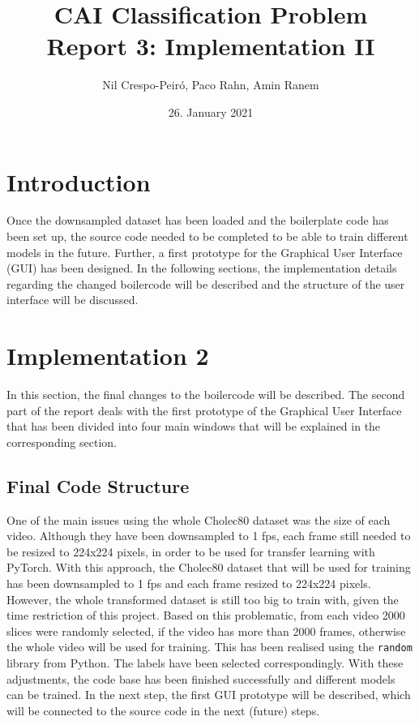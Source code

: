 \documentclass{article}
\title{CAI Classification Problem\\Report 3: Implementation II}
\author{Nil Crespo-Peiró, Paco Rahn, Amin Ranem}
\date{26. January 2021}
\begin{document}
\maketitle

\section{Introduction}
Once the downsampled dataset has been loaded and the boilerplate code has been set up, the source code needed to be completed to be able to train different models in the future. Further, a first prototype for the Graphical User Interface (GUI) has been designed.
\noindent
In the following sections, the implementation details regarding the changed boilercode will be described and the structure of the user interface will be discussed.\\

\section{Implementation 2}
In this section, the final changes to the boilercode will be described.
\noindent
The second part of the report deals with the first prototype of the Graphical User Interface that has been divided into four main windows that will be explained in the corresponding section. 

\subsection{Final Code Structure}
One of the main issues using the whole Cholec80 dataset was the size of each video. Although they have been downsampled to 1 fps, each frame still needed to be resized to 224x224 pixels, in order to be used for transfer learning with PyTorch. With this approach, the Cholec80 dataset that will be used for training has been downsampled to 1 fps and each frame resized to 224x224 pixels. However, the whole transformed dataset is still too big to train with, given the time restriction of this project. Based on this problematic, from each video 2000 slices were randomly selected, if the video has more than 2000 frames, otherwise the whole video will be used for training. This has been realised using the \texttt{random} library from Python. The labels have been selected correspondingly. With these adjustments, the code base has been finished successfully and different models can be trained. In the next step, the first GUI prototype will be described, which will be connected to the source code in the next (future) steps.
\end{document}

